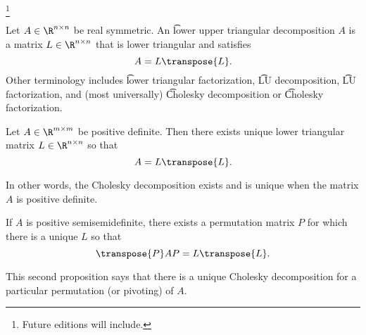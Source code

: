 
\footnote{Future editions will include.}


Let $A \in \R^{n \times n}$ be real symmetric.
An \t{lower upper triangular decomposition}
$A$ is a matrix $L \in \R^{n \times n}$ that is lower triangular and satisfies
\[
  A = L\transpose{L}.
\]
Other terminology includes \t{lower triangular factorization}, \t{LU decomposition}, \t{LU factorization}, and (most universally) \t{Cholesky decomposition} or \t{Cholesky factorization}.


\begin{proposition}
  Let $A \in \R^{m \times m}$ be positive definite. Then there exists unique lower triangular matrix $L \in \R^{n \times n}$ so that
  \[
    A = L\transpose{L}.
  \]
\end{proposition}
In other words, the Cholesky decomposition exists and is unique when the matrix $A$ is positive definite.

\begin{proposition}
  If $A$ is positive semisemidefinite, there exists a permutation matrix $P$ for which there is a unique  $L$ so that
  \[
    \transpose{P}AP = L\transpose{L}.
  \]
\end{proposition}

This second proposition says that there is a unique Cholesky decomposition for a particular permutation (or pivoting) of $A$.



\blankpage
